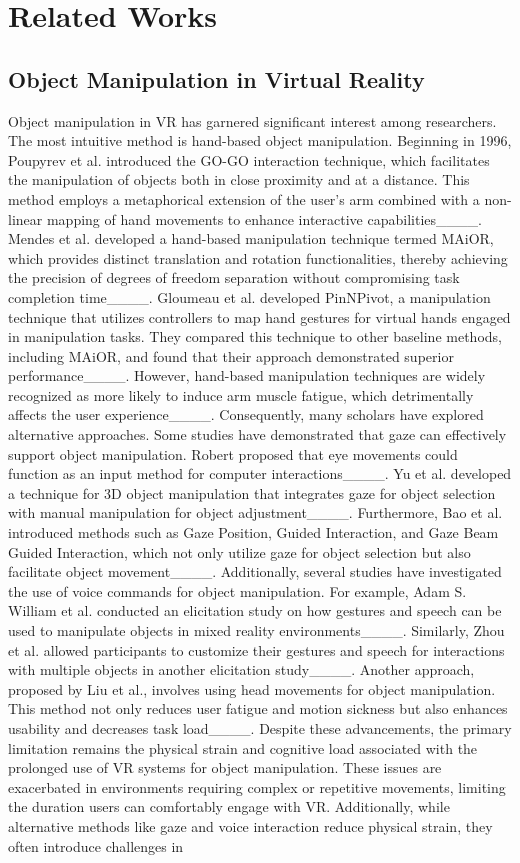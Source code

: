 \section{Related Works}
\subsection{Object Manipulation in Virtual Reality}
Object manipulation in VR has garnered significant interest among researchers. The most intuitive method is hand-based object manipulation. Beginning in 1996, Poupyrev et al. introduced the GO-GO interaction technique, which facilitates the manipulation of objects both in close proximity and at a distance. This method employs a metaphorical extension of the user's arm combined with a non-linear mapping of hand movements to enhance interactive capabilities____. Mendes et al. developed a hand-based manipulation technique termed MAiOR, which provides distinct translation and rotation functionalities, thereby achieving the precision of degrees of freedom separation without compromising task completion time____. Gloumeau et al. developed PinNPivot, a manipulation technique that utilizes controllers to map hand gestures for virtual hands engaged in manipulation tasks. They compared this technique to other baseline methods, including MAiOR, and found that their approach demonstrated superior performance____. However, hand-based manipulation techniques are widely recognized as more likely to induce arm muscle fatigue, which detrimentally affects the user experience____. Consequently, many scholars have explored alternative approaches. Some studies have demonstrated that gaze can effectively support object manipulation. Robert proposed that eye movements could function as an input method for computer interactions____. Yu et al. developed a technique for 3D object manipulation that integrates gaze for object selection with manual manipulation for object adjustment____. Furthermore, Bao et al. introduced methods such as Gaze Position, Guided Interaction, and Gaze Beam Guided Interaction, which not only utilize gaze for object selection but also facilitate object movement____. Additionally, several studies have investigated the use of voice commands for object manipulation. For example, Adam S. William et al. conducted an elicitation study on how gestures and speech can be used to manipulate objects in mixed reality environments____. Similarly, Zhou et al. allowed participants to customize their gestures and speech for interactions with multiple objects in another elicitation study____. Another approach, proposed by Liu et al., involves using head movements for object manipulation. This method not only reduces user fatigue and motion sickness but also enhances usability and decreases task load____. Despite these advancements, the primary limitation remains the physical strain and cognitive load associated with the prolonged use of VR systems for object manipulation. These issues are exacerbated in environments requiring complex or repetitive movements, limiting the duration users can comfortably engage with VR. Additionally, while alternative methods like gaze and voice interaction reduce physical strain, they often introduce challenges in 